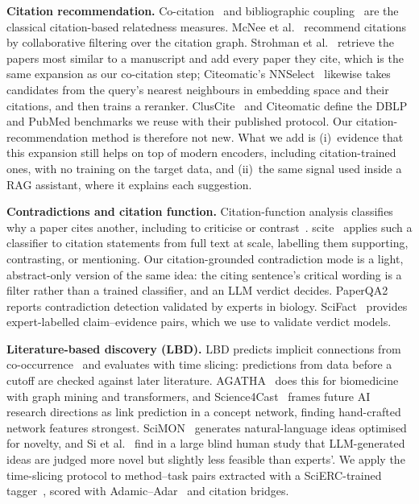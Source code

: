 \documentclass[conference]{IEEEtran}
\begin{document}
\textbf{Citation recommendation.} Co-citation~\cite{small1973cocitation} and bibliographic coupling~\cite{kessler1963bibliographic} are the classical citation-based relatedness measures. McNee et al.~\cite{mcnee2002citations} recommend citations by collaborative filtering over the citation graph. Strohman et al.~\cite{strohman2007citations} retrieve the papers most similar to a manuscript and add every paper they cite, which is the same expansion as our co-citation step; Citeomatic's NNSelect~\cite{bhagavatula2018content} likewise takes candidates from the query's nearest neighbours in embedding space and their citations, and then trains a reranker. ClusCite~\cite{ren2014cluscite} and Citeomatic define the DBLP and PubMed benchmarks we reuse with their published protocol. Our citation-recommendation method is therefore not new. What we add is (i)~evidence that this expansion still helps on top of modern encoders, including citation-trained ones, with no training on the target data, and (ii)~the same signal used inside a RAG assistant, where it explains each suggestion.

\textbf{Contradictions and citation function.} Citation-function analysis classifies why a paper cites another, including to criticise or contrast~\cite{teufel2006citation,jurgens2018citation,cohan2019scaffolds}. scite~\cite{nicholson2021scite} applies such a classifier to citation statements from full text at scale, labelling them supporting, contrasting, or mentioning. Our citation-grounded contradiction mode is a light, abstract-only version of the same idea: the citing sentence's critical wording is a filter rather than a trained classifier, and an LLM verdict decides. PaperQA2~\cite{skarlinski2024paperqa2} reports contradiction detection validated by experts in biology. SciFact~\cite{wadden2020scifact} provides expert-labelled claim--evidence pairs, which we use to validate verdict models.

\textbf{Literature-based discovery (LBD).} LBD predicts implicit connections from co-occurrence~\cite{swanson1986fish} and evaluates with time slicing: predictions from data before a cutoff are checked against later literature. AGATHA~\cite{sybrandt2020agatha} does this for biomedicine with graph mining and transformers, and Science4Cast~\cite{krenn2023forecasting} frames future AI research directions as link prediction in a concept network, finding hand-crafted network features strongest. SciMON~\cite{wang2024scimon} generates natural-language ideas optimised for novelty, and Si et al.~\cite{si2025ideas} find in a large blind human study that LLM-generated ideas are judged more novel but slightly less feasible than experts'. We apply the time-slicing protocol to method--task pairs extracted with a SciERC-trained tagger~\cite{luan2018scierc,beltagy2019scibert}, scored with Adamic--Adar~\cite{adamic2003friends} and citation bridges.
\end{document}
